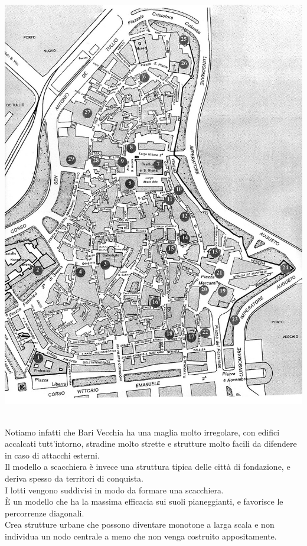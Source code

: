 \documentclass[a4paper,12pt, oneside]{book}
\begin{document}
   \begin{center}
  	\includegraphics[width=0.6\linewidth]{"immagini/bari_vecchia"}
  	\label{fig:bari_vecchia}
  \end{center}
  \leavevmode\\
  Notiamo infatti che Bari Vecchia ha una maglia molto irregolare, con edifici accalcati tutt'intorno, stradine molto strette e strutture molto facili da difendere in caso di attacchi esterni.\\
  Il modello a scacchiera è invece una struttura tipica delle città di fondazione, e deriva spesso da territori di conquista.\\ I lotti vengono suddivisi in modo da formare una scacchiera.\\
  È un modello che ha la massima efficacia sui suoli pianeggianti, e favorisce le percorrenze diagonali.\\
  Crea strutture urbane che possono diventare monotone a larga scala e non individua un nodo centrale a meno che non venga costruito appositamente.\\
\end{document}
